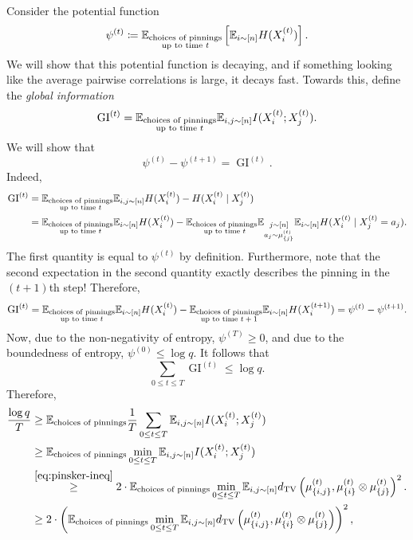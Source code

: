 \documentclass{article}
\newcommand{\GI}{\operatorname{GI}}
\begin{document}
Consider the potential function
\[ \psi^{(t)} \coloneqq \mathbb{E}_{\substack{\text{choices of pinnings} \\ \text{up to time $t$}}} \left[ \mathbb{E}_{i \sim [n]} H(X_i^{(t)}) \right]. \]
We will show that this potential function is decaying, and if something looking like the average pairwise correlations is large, it decays fast. Towards this, define the \emph{global information}
\[ \GI^{(t)} = \E_{\substack{\text{choices of pinnings} \\ \text{up to time $t$}}} \E_{i,j \sim [n]} I( X_i^{(t)} ; X_j^{(t)} ). \]
We will show that
\[ \psi^{(t)} - \psi^{(t+1)} = \GI^{(t)}. \]
Indeed,
\begin{align*}
	\GI^{(t)} &= \E_{\substack{\text{choices of pinnings} \\ \text{up to time $t$}}} \E_{i,j \sim [n]} H(X_i^{(t)}) - H(X_i^{(t)} \mid X_j^{(t)}) \\
		&= \E_{\substack{\text{choices of pinnings} \\ \text{up to time $t$}}} \E_{i \sim [n]} H(X_i^{(t)}) - \E_{\substack{\text{choices of pinnings} \\ \text{up to time $t$}}} \E_{\substack{j \sim [n] \\ a_j \sim \mu_{\{j\}}^{(t)}}} \E_{i \sim [n]} H(X_i^{(t)} \mid X_j^{(t)} = a_j).
\end{align*}
The first quantity is equal to $\psi^{(t)}$ by definition. Furthermore, note that the second expectation in the second quantity exactly describes the pinning in the $(t+1)$th step! Therefore,
\[
\GI^{(t)} = \E_{\substack{\text{choices of pinnings} \\ \text{up to time $t$}}} \E_{i \sim [n]} H(X_i^{(t)}) - \E_{\substack{\text{choices of pinnings} \\ \text{up to time $t+1$}}} \E_{i \sim [n]} H(X_i^{(t+1)}) = \psi^{(t)} - \psi^{(t+1)}.
\]
Now, due to the non-negativity of entropy, $\psi^{(T)} \ge 0$, and due to the boundedness of entropy, $\psi^{(0)} \le \log q$. It follows that
\[ \sum_{0 \le t \le T} \GI^{(t)} \le \log q. \]
Therefore,
\begin{align*}
	\frac{\log q}{T} &\ge \mathbb{E}_{\text{choices of pinnings}} \frac{1}{T} \sum_{0 \le t \le T} \mathbb{E}_{i,j \sim [n]} I( X_i^{(t)} ; X_j^{(t)} ) \\
		&\ge \mathbb{E}_{\text{choices of pinnings}} \min_{0 \le t \le T} \mathbb{E}_{i,j \sim [n]} I( X_i^{(t)} ; X_j^{(t)} ) \\
		&\stackrel{\eqref{eq:pinsker-ineq}}{\ge} 2 \cdot \mathbb{E}_{\text{choices of pinnings}} \min_{0 \le t \le T} \mathbb{E}_{i,j \sim [n]} d_{\mathrm{TV}}\left( \mu_{\{i,j\}}^{(t)} , \mu_{\{i\}}^{(t)} \otimes \mu_{\{j\}}^{(t)} \right)^2. \\
		&\ge 2 \cdot \left( \mathbb{E}_{\text{choices of pinnings}} \min_{0 \le t \le T} \mathbb{E}_{i,j \sim [n]} d_{\mathrm{TV}}\left( \mu_{\{i,j\}}^{(t)} , \mu_{\{i\}}^{(t)} \otimes \mu_{\{j\}}^{(t)} \right) \right)^2,
\end{align*}
\end{document}
